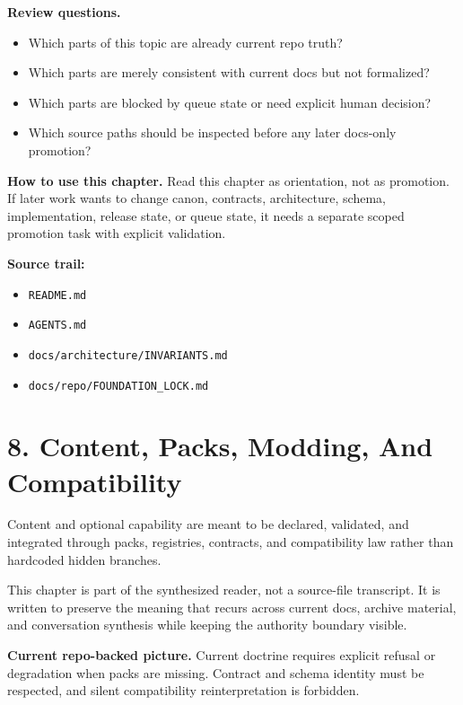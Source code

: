 \documentclass[10.5pt,a4paper,openany]{book}
\begin{document}
\textbf{Review questions.}


\begin{itemize}
\item Which parts of this topic are already current repo truth?
\item Which parts are merely consistent with current docs but not formalized?
\item Which parts are blocked by queue state or need explicit human decision?
\item Which source paths should be inspected before any later docs-\allowbreak{}only promotion?
\end{itemize}

\textbf{How to use this chapter.} Read this chapter as orientation, not as promotion.\allowbreak{} If later work wants to change canon, contracts, architecture, schema, implementation, release state, or queue state, it needs a separate scoped promotion task with explicit validation.\allowbreak{}


\textbf{Source trail:}


\begin{itemize}
\item \texttt{README.\allowbreak{}md}
\item \texttt{AGENTS.\allowbreak{}md}
\item \texttt{docs/\allowbreak{}architecture/\allowbreak{}INVARIANTS.\allowbreak{}md}
\item \texttt{docs/\allowbreak{}repo/\allowbreak{}FOUNDATION\_\allowbreak{}LOCK.\allowbreak{}md}
\end{itemize}


\section{8. Content, Packs, Modding, And Compatibility}

Content and optional capability are meant to be declared, validated, and integrated through packs, registries, contracts, and compatibility law rather than hardcoded hidden branches.\allowbreak{}


This chapter is part of the synthesized reader, not a source-\allowbreak{}file transcript.\allowbreak{} It is written to preserve the meaning that recurs across current docs, archive material, and conversation synthesis while keeping the authority boundary visible.\allowbreak{}


\textbf{Current repo-backed picture.} Current doctrine requires explicit refusal or degradation when packs are missing.\allowbreak{} Contract and schema identity must be respected, and silent compatibility reinterpretation is forbidden.\allowbreak{}
\end{document}
